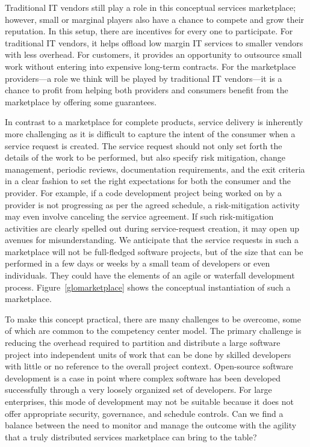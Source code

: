 Traditional IT vendors still play a role in this conceptual services
marketplace; however, small or marginal players also have a chance to compete
and grow their reputation. In this setup, there are incentives for every one to
participate. For traditional IT vendors, it helps offload low margin IT services
to smaller vendors with less overhead. For customers, it provides an opportunity
to outsource small work without entering into expensive long-term contracts. For
the marketplace providers---a role we think will be played by traditional IT
vendors---it is a chance to profit from helping both providers and consumers
benefit from the marketplace by offering some guarantees.

In contrast to a marketplace for complete products, service delivery is
inherently more challenging as it is difficult to capture the intent of the
consumer when a service request is created. The service request should not only
set forth the details of the work to be performed, but also specify risk
mitigation, change management, periodic reviews, documentation requirements, and
the exit criteria in a clear fashion to set the right expectations for both the
consumer and the provider.  For example, if a code development project being
worked on by a provider is not progressing as per the agreed schedule, a
risk-mitigation activity may even involve canceling the service agreement. If
such risk-mitigation activities are clearly spelled out during service-request
creation, it may open up avenues for misunderstanding. We anticipate that the
service requests in such a marketplace will not be full-fledged software
projects, but of the size that can be performed in a few days or weeks by a
small team of developers or even individuals. They could have the elements of an
agile or waterfall development process. Figure~\ref{glomarketplace} shows the
conceptual instantiation of such a marketplace.

To make this concept practical, there are many challenges to be overcome, some
of which are common to the competency center model. The primary challenge is
reducing the overhead required to partition and distribute a large software
project into independent units of work that can be done by skilled developers
with little or no reference to the overall project context. Open-source software
development is a case in point where complex software has been developed
successfully through a very loosely organized set of developers. For large
enterprises, this mode of development may not be suitable because it does not
offer appropriate security, governance, and schedule controls. Can we find a
balance between the need to monitor and manage the outcome with the agility that
a truly distributed services marketplace can bring to the table?

